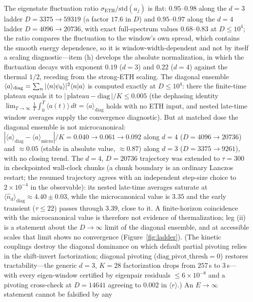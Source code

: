 \begin{remark}
The eigenstate fluctuation ratio $\sigma_{\mathrm{ETH}}/\mathrm{std}(a_{j})$ is flat:
$0.95$--$0.98$ along the $d=3$ ladder $D=3375\to59319$ (a factor $17.6$ in $D$) and
$0.95$--$0.97$ along the $d=4$ ladder $D=4096\to20736$, with exact full-spectrum values
$0.68$--$0.83$ at $D\leq10^{4}$; the ratio compares the fluctuation to the window's own
spread, which contains the smooth energy dependence, so it is window-width-dependent and
not by itself a scaling diagnostic---item (h) develops the absolute normalization, in which
the fluctuation decays with exponent $0.19$ ($d=3$) and $0.22$ ($d=4$) against the thermal
$1/2$, receding from the strong-ETH scaling. The diagonal ensemble
$\langle a\rangle_{\mathrm{diag}}=\sum_{n}|\langle n\rvert \psi_{0}\rangle|^{2}\langle n\rvert a\rangle$
is computed exactly at $D\leq10^{4}$: there the finite-time plateau equals it to
$|\,\mathrm{plateau}-\mathrm{diag}\,|/K\leq0.005$ (the dephasing identity
$\lim_{T\to\infty}\frac{1}{T}\int_{0}^{T}\langle a(t)\rangle\,dt=\langle
a\rangle_{\mathrm{diag}}$ holds with no ETH input, and nested late-time window averages
supply the convergence diagnostic). But at matched dose the diagonal ensemble is not
microcanonical: $|\langle a\rangle_{\mathrm{diag}}-\langle
a\rangle_{\mathrm{micro}}|/K=0.040\to0.061\to0.092$ along $d=4$ ($D=4096\to20736$) and
$\approx0.05$ (stable in absolute value, $\approx0.87$) along $d=3$ ($D=3375\to9261$),
with no closing trend. The $d=4$, $D=20736$ trajectory was extended to $\tau=300$ in
checkpointed wall-clock chunks (a chunk boundary is an ordinary Lanczos restart; the resumed
trajectory agrees with an independent step-size choice to $2\times10^{-4}$ in the
observable): its nested late-time averages saturate at
$\langle\hat n_{d}\rangle_{\mathrm{diag}}\approx4.40\pm0.03$, while the microcanonical value
is $3.35$ and the early transient ($\tau\leq22$) passes through $3.39$, close to it. A
finite-horizon coincidence with the microcanonical value is therefore not evidence of
thermalization; leg (ii) is a statement about the $D\to\infty$ limit of the diagonal
ensemble, and at accessible scales that limit shows no convergence (Figure~\ref{fig:ladder}).
(The kinetic couplings destroy the diagonal dominance on which default partial pivoting
relies in the shift-invert factorization; diagonal pivoting
($\mathrm{diag\_pivot\_thresh}=0$) restores tractability---the generic $d=3$, $K=28$
factorization drops from $257$\,s to $3$\,s---with every eigen-window certified by
eigenpair residuals $\leq6\times10^{-8}$ and a pivoting cross-check at $D=14641$ agreeing
to $0.002$ in $\langle r\rangle$.) An $E\to\infty$ statement cannot be falsified by any

\end{remark}
